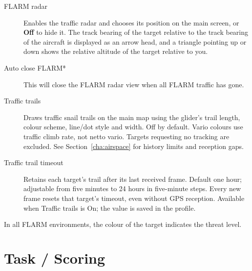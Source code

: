 \begin{description}
\item[FLARM radar]  \label{conf:flarmdisplay}\label{conf:flarmradar-place} Enables the traffic radar and
  chooses its position on the main screen, or {\bf Off} to hide it.
  The track bearing of the target relative to the track bearing of the 
  aircraft is displayed as an arrow head, and a triangle pointing up or down shows 
  the relative altitude of the target relative to you.
\\
\item[Auto close FLARM*]  This will close the FLARM radar view when all FLARM 
  traffic has gone.
\item[Traffic trails] Draws traffic snail trails on the main map using
  the glider's trail length, colour scheme, line/dot style and width.
  Off by default.  Vario colours use traffic climb rate, not netto
  vario.  Targets requesting no tracking are excluded.  See
  Section~\ref{cha:airspace} for history limits and reception gaps.
\item[Traffic trail timeout] Retains each target's trail after its last
  received frame.  Default one hour; adjustable from five minutes to
  24 hours in five-minute steps.  Every new frame resets that target's
  timeout, even without GPS reception.  Available when Traffic trails
  is On; the value is saved in the profile.
\end{description}
In all FLARM environments, the colour of the target indicates the threat level.


\section{Task / Scoring}

